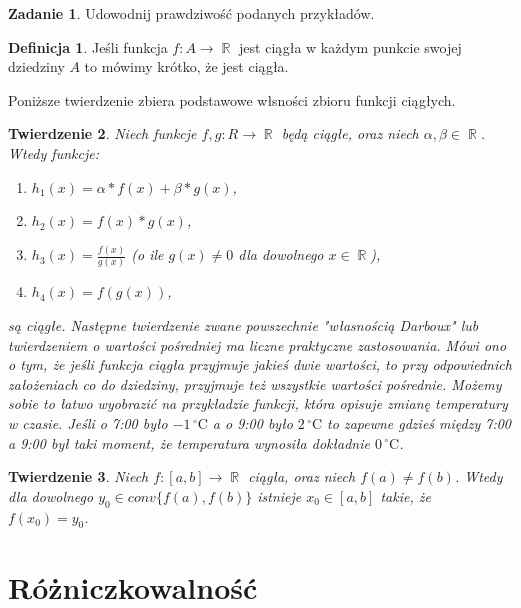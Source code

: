 \documentclass[12pt,a4paper]{article}
\newtheorem{tw}{Twierdzenie}[section]
\theoremstyle{definition}
\newtheorem{df}[tw]{Definicja}
\newtheorem{zad}{Zadanie}
\DeclareMathOperator{\R}{\mathbb{R}}
\begin{document}
	\begin{zad}
		Udowodnij prawdziwość podanych przykładów.\\
	\end{zad}
	\begin{df}
		Jeśli funkcja $f:  A \rightarrow \R$ jest ciągła w każdym punkcie swojej dziedziny $A$ to mówimy krótko, że jest ciągła.


		Poniższe twierdzenie zbiera podstawowe włsności zbioru funkcji ciągłych.\\
	\end{df}
	\begin{tw}
		Niech funkcje $f,g: R \rightarrow \R$ będą ciągłe, oraz niech $\alpha, \beta \in \R$.\\
		Wtedy funkcje:
		\begin{enumerate}
			\item[a)] $h_1(x)=\alpha*f(x)+\beta*g(x)$,
			\item[b)] $h_2(x)=f(x)*g(x)$,
			\item[c)] $h_3(x)=\frac{f(x)}{g(x)}$ (o ile $g(x)\neq0$ dla dowolnego $x\in \R$),
			\item[d)] $h_4(x)=f(g(x))$,
		\end{enumerate}
		są ciągłe.
		Następne twierdzenie zwane powszechnie "własnością Darboux" lub twierdzeniem o wartości pośredniej ma liczne praktyczne zastosowania. Mówi ono o tym, że jeśli funkcja ciągła przyjmuje jakieś dwie wartości, to przy odpowiednich założeniach co do dziedziny, przyjmuje  też wszystkie wartości pośrednie. Możemy sobie to łatwo wyobrazić na przykładzie funkcji, która opisuje zmianę temperatury w czasie. Jeśli o 7:00 było $-1\,^{\circ}\mathrm{C}$ a o 9:00 było $2\,^{\circ}\mathrm{C}$ to zapewne gdzieś między 7:00 a 9:00 był taki moment, że temperatura wynosiła dokładnie $0\,^{\circ}\mathrm{C}$.

	\end{tw}
	\begin{tw}
		Niech $f:[a,b] \rightarrow \R$ ciągła, oraz niech $f(a) \neq f(b)$. Wtedy dla dowolnego $y_0 \in conv\{f(a),f(b)\}$ istnieje $x_0 \in [a,b]$ takie, że $f(x_0)=y_0$.
	\end{tw}

		
\section{Różniczkowalność}
\end{document}
